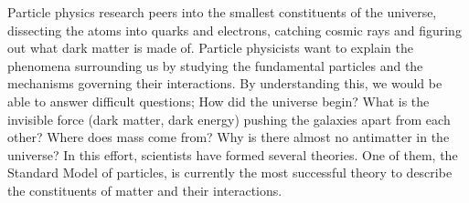 Particle physics research peers into the smallest constituents of the universe, dissecting the atoms into quarks and electrons, catching cosmic rays and figuring out what dark matter is made of. Particle physicists want to explain the phenomena surrounding us by studying the fundamental particles and the mechanisms governing their interactions. By understanding this, we would be able to answer difficult questions; How did the universe begin? What is the invisible force (dark matter, dark energy) pushing the galaxies apart from each other? Where does mass come from? Why is there almost no antimatter in the universe? In this effort, scientists have formed several theories. One of them, the Standard Model of particles, is currently the most successful theory to describe the constituents of matter and their interactions.

